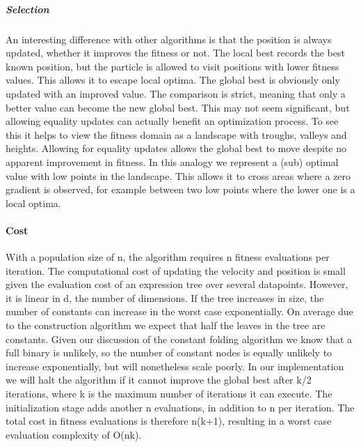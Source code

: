 \subparagraph{Selection}
An interesting difference with other algorithms is that the position is always updated, whether it improves the fitness or not. The local best records the best known position, but the particle is allowed to visit positions with lower fitness values. This allows it to escape local optima. The global best is obviously only updated with an improved value. The comparison is strict, meaning that only a better value can become the new global best. This may not seem significant, but allowing equality updates can actually benefit an optimization process. To see this it helps to view the fitness domain as a landscape with troughs, valleys and heights. Allowing for equality updates allows the global best to move despite no apparent improvement in fitness. In this analogy we represent a (sub) optimal value with low points in the landscape.
This allows it to cross areas where a zero gradient is observed, for example between two low points where the lower one is a local optima. 

\paragraph{Cost}\label{psocost}
With a population size of n, the algorithm requires n fitness evaluations per iteration. The computational cost of updating the velocity and position is small given the evaluation cost of an expression tree over several datapoints. However, it is linear in d, the number of dimensions. If the tree increases in size, the number of constants can increase in the worst case exponentially. On average due to the construction algorithm we expect that half the leaves in the tree are constants. Given our discussion of the constant folding algorithm we know that a full binary is unlikely, so the number of constant nodes is equally unlikely to increase exponentially, but will nonetheless scale poorly.
In our implementation we will halt the algorithm if it cannot improve the global best after k/2 iterations, where k is the maximum number of iterations it can execute. The initialization stage adds another n evaluations, in addition to n per iteration. The total cost in fitness evaluations is therefore n(k+1), resulting in a worst case evaluation complexity of O(nk).

